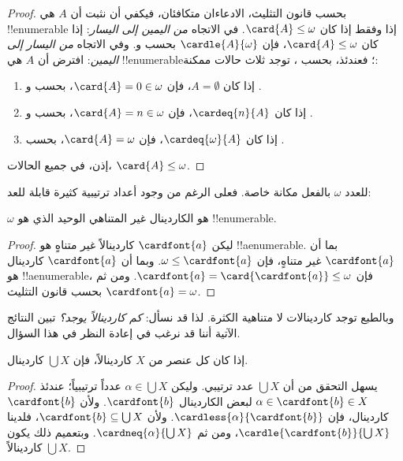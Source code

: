\documentclass[../../../include/open-logic-section]{subfiles}
\begin{document}
\begin{proof}
بحسب قانون التثليث، الادعاءان متكافئان، فيكفي أن نثبت أن $A$ هي
!!{enumerable} إذا وفقط إذا كان $\card{A} \leq \omega$. في الاتجاه
\emph{من اليمين إلى اليسار}: إذا كان $\card{A} \leq \omega$، فإن
$\cardle{A}{\omega}$ بحسب
و. وفي الاتجاه \emph{من اليسار إلى اليمين}:
افترض أن $A$ هي !!{enumerable}؛ فعندئذ، بحسب
، توجد ثلاث حالات ممكنة:
\begin{enumerate}
	\item إذا كان $A = \emptyset$، فإن $\card{A} = 0 \in \omega$، بحسب
	 و
	.
	\item إذا كان $\cardeq{n}{A}$، فإن $\card{A} = n \in \omega$، بحسب
	 و
	.
	\item إذا كان $\cardeq{\omega}{A}$، فإن $\card{A} = \omega$، بحسب
	.
\end{enumerate}
إذن، في جميع الحالات، $\card{A} \leq \omega$.
\end{proof}
\noindent
للعدد $\omega$ بالفعل مكانة خاصة. فعلى الرغم من وجود أعداد ترتيبية كثيرة
قابلة للعد:

\begin{cor}
$\omega$ هو الكاردينال غير المتناهي الوحيد الذي هو !!{enumerable}.
\end{cor}

\begin{proof}
ليكن $\cardfont{a}$ كاردينالاً غير متناهٍ هو !!a{enumerable}. بما أن
$\cardfont{a}$ غير متناهٍ، فإن $\omega \leq \cardfont{a}$. وبما أن
$\cardfont{a}$ كاردينال هو !!a{enumerable}، فإن
$\cardfont{a} = \card{\cardfont{a}} \leq \omega$. ومن ثم
$\cardfont{a} = \omega$ بحسب قانون التثليث.
\end{proof}

وبالطبع توجد كاردينالات لا متناهية الكثرة. لذا قد نسأل:
\emph{كم كاردينالاً يوجد؟} تبين النتائج الآتية أننا قد نرغب في إعادة
النظر في هذا السؤال.

\begin{prop}
إذا كان كل عنصر من $X$ كاردينالاً، فإن $\bigcup X$ كاردينال.
\end{prop}

\begin{proof}
يسهل التحقق من أن $\bigcup X$ عدد ترتيبي. وليكن
$\alpha \in \bigcup X$ عدداً ترتيبياً؛ عندئذ
$\alpha \in \cardfont{b} \in X$ لبعض الكاردينال $\cardfont{b}$. ولأن
$\cardfont{b}$ كاردينال، فإن $\cardless{\alpha}{\cardfont{b}}$. ولأن
$\cardfont{b} \subseteq \bigcup X$، فلدينا
$\cardle{\cardfont{b}}{\bigcup X}$، ومن ثم
$\cardneq{\alpha}{\bigcup X}$. وبتعميم ذلك يكون $\bigcup X$
كاردينالاً.
\end{proof}
\end{document}
